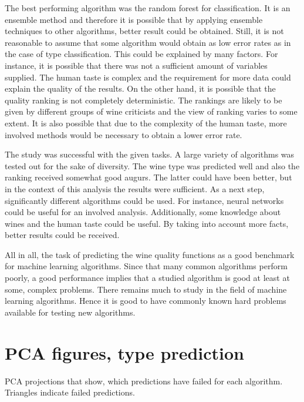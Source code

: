 \documentclass[twoside]{article}
\begin{document}
\begin{multicols}{2}
The best performing algorithm was the random forest for classification. It is an ensemble method and therefore it is possible that by applying
ensemble techniques to other algorithms, better result could be obtained. Still, it is not reasonable to assume that some algorithm would obtain
as low error rates as in the case of type classification. This could be explained by many factors. For instance, it is possible that there was not 
a sufficient amount of variables supplied. The human taste is complex and the requirement for more data could explain the quality
of the results. On the other hand, it is possible that the quality ranking is not completely deterministic. The rankings are likely to be given by different
groups of wine criticists and the view of ranking varies to some extent. It is also possible that due to the complexity of the human
taste, more involved methods would be necessary to obtain a lower error rate.

The study was successful with the given tasks. A large variety of algorithms was tested out for the sake of diversity.
The wine type was predicted well and also the ranking received somewhat good augurs. The latter could have been better, but in the context of this
analysis the results were sufficient. As a next step, significantly different algorithms could be used. For instance, neural networks could be useful
for an involved analysis. Additionally, some knowledge about wines and the human taste could be useful. By taking into account more facts,
better results could be received. 

All in all, the task of predicting the wine quality functions as a good benchmark for machine learning algorithms. Since
that many common algorithms perform poorly, a good performance implies that a studied algorithm is good at least at some, complex problems.
There remains much to study in the field of machine learning algorithms. Hence it is good to have commonly known hard problems available for testing
new algorithms.



{}

\appendix

\section{PCA figures, type prediction}\label{appendix:colorpcakuvet}
PCA projections that show, which predictions have failed for each algorithm.
Triangles indicate failed predictions.


\end{multicols}
\end{document}
